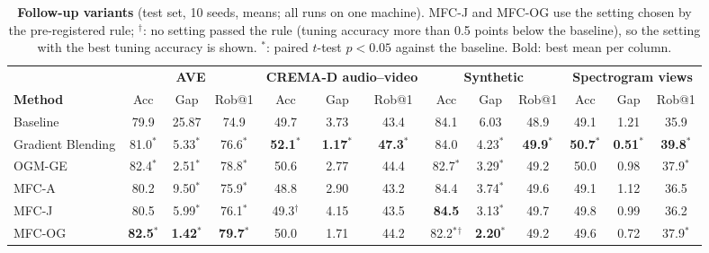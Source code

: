 \documentclass[fleqn,10pt]{wlscirep}
\begin{document}
\begin{table}[t]
\caption{\textbf{Follow-up variants} (test set, 10 seeds, means; all runs on one machine). MFC-J and MFC-OG use the setting chosen by the pre-registered rule; $^{\dagger}$: no setting passed the rule (tuning accuracy more than 0.5 points below the baseline), so the setting with the best tuning accuracy is shown. $^{*}$: paired $t$-test $p<0.05$ against the baseline. Bold: best mean per column.}
\label{tab:variants}
\centering
\footnotesize
\setlength{\tabcolsep}{2.5pt}
\begin{tabular}{@{}lcccccccccccc@{}}
\toprule
& \multicolumn{3}{c}{\textbf{AVE}} & \multicolumn{3}{c}{\textbf{CREMA-D audio--video}} & \multicolumn{3}{c}{\textbf{Synthetic}} & \multicolumn{3}{c}{\textbf{Spectrogram views}} \\
\cmidrule(lr){2-4}\cmidrule(lr){5-7}\cmidrule(lr){8-10}\cmidrule(lr){11-13}
\textbf{Method} & Acc & Gap & Rob@1 & Acc & Gap & Rob@1 & Acc & Gap & Rob@1 & Acc & Gap & Rob@1 \\ \midrule
Baseline & 79.9 & 25.87 & 74.9 & 49.7 & 3.73 & 43.4 & 84.1 & 6.03 & 48.9 & 49.1 & 1.21 & 35.9 \\
Gradient Blending & 81.0$^{*}$ & 5.33$^{*}$ & 76.6$^{*}$ & \textbf{52.1$^{*}$} & \textbf{1.17$^{*}$} & \textbf{47.3$^{*}$} & 84.0 & 4.23$^{*}$ & \textbf{49.9$^{*}$} & \textbf{50.7$^{*}$} & \textbf{0.51$^{*}$} & \textbf{39.8$^{*}$} \\
OGM-GE & 82.4$^{*}$ & 2.51$^{*}$ & 78.8$^{*}$ & 50.6 & 2.77 & 44.4 & 82.7$^{*}$ & 3.29$^{*}$ & 49.2 & 50.0 & 0.98 & 37.9$^{*}$ \\
MFC-A & 80.2 & 9.50$^{*}$ & 75.9$^{*}$ & 48.8 & 2.90 & 43.2 & 84.4 & 3.74$^{*}$ & 49.6 & 49.1 & 1.12 & 36.5 \\
MFC-J & 80.5 & 5.99$^{*}$ & 76.1$^{*}$ & 49.3$^{\dagger}$ & 4.15 & 43.5 & \textbf{84.5} & 3.13$^{*}$ & 49.7 & 49.8 & 0.99 & 36.2 \\
MFC-OG & \textbf{82.5$^{*}$} & \textbf{1.42$^{*}$} & \textbf{79.7$^{*}$} & 50.0 & 1.71 & 44.2 & 82.2$^{*}$$^{\dagger}$ & \textbf{2.20$^{*}$} & 49.2 & 49.6 & 0.72 & 37.9$^{*}$ \\
\bottomrule
\end{tabular}
\end{table}
\end{document}
